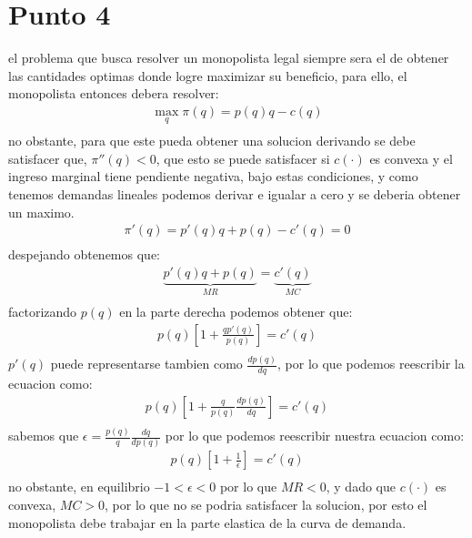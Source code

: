 \documentclass[11pt]{article}
\begin{document}
\section{Punto 4}
\begin{flushleft}
    el problema que busca resolver un monopolista legal siempre sera el de obtener las cantidades optimas donde logre maximizar su beneficio,
    para ello, el monopolista entonces debera resolver:
    \begin{align*}
        \max_q \pi(q) = p(q)q-c(q)\\
    \end{align*}
    no obstante, para que este pueda obtener una solucion derivando se debe satisfacer que, $\pi''(q)<0$,
    que esto se puede satisfacer si $c(\cdot)$ es convexa y el ingreso marginal tiene pendiente negativa, bajo estas condiciones, y como tenemos demandas lineales
    podemos derivar e igualar a cero y se deberia obtener un maximo.
    \begin{align*}
        \pi'(q) = p'(q)q+p(q)-c'(q) = 0\\
    \end{align*}
    despejando obtenemos que:
    \begin{align*}
        \underbrace{p'(q)q+p(q)}_{MR} = \underbrace{c'(q)}_{MC}\\
    \end{align*}
    factorizando $p(q)$ en la parte derecha podemos obtener que:
    \begin{align*}
        p(q)\left[1+\frac{qp'(q)}{p(q)}\right]=c'(q)\\
    \end{align*}
    $p'(q)$ puede representarse tambien como $\frac{dp(q)}{dq}$, por lo que podemos reescribir la ecuacion como:
    \begin{align*}
        p(q)\left[1+\frac{q}{p(q)}\frac{dp(q)}{dq}\right]=c'(q)\\
    \end{align*}
    sabemos que $\epsilon = \frac{p(q)}{q}\frac{dq}{dp(q)}$ por lo que podemos reescribir nuestra ecuacion como:
    \begin{align*}
        p(q)\left[1+\frac{1}{\epsilon}\right]=c'(q)\\
    \end{align*}
    no obstante, en equilibrio $-1 < \epsilon < 0$ por lo que $MR<0$, y dado que $c(\cdot)$ es convexa, $MC>0$, por lo que no se podria satisfacer la solucion,
    por esto el monopolista debe trabajar en la parte elastica de la curva de demanda.

\end{flushleft}
\end{document}
